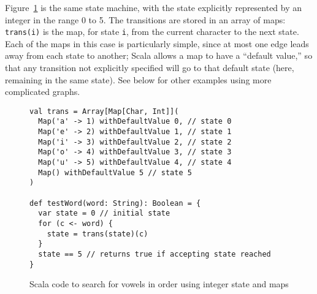 Figure~\ref{fig:vowelsinteger} is the same state machine, with the state explicitly represented by an integer
in the range 0 to 5. The transitions are stored in an array of maps: \verb|trans(i)| is the
map, for state \verb|i|, from the current character to the next state. Each of the maps in
this case is particularly simple, since at most one edge leads away from each state
to another; Scala allows a map to have a ``default value,'' so that any transition not
explicitly specified will go to that default state (here, remaining in the same
state). See below for other examples using more complicated graphs.
\begin{figure}
\begin{verbatim}
val trans = Array[Map[Char, Int]](
  Map('a' -> 1) withDefaultValue 0, // state 0
  Map('e' -> 2) withDefaultValue 1, // state 1
  Map('i' -> 3) withDefaultValue 2, // state 2
  Map('o' -> 4) withDefaultValue 3, // state 3
  Map('u' -> 5) withDefaultValue 4, // state 4
  Map() withDefaultValue 5 // state 5
)

def testWord(word: String): Boolean = {
  var state = 0 // initial state
  for (c <- word) {
    state = trans(state)(c)
  }
  state == 5 // returns true if accepting state reached
}
\end{verbatim}
\caption{Scala code to search for vowels in order using integer state and maps}
\label{fig:vowelsinteger}
\end{figure}

